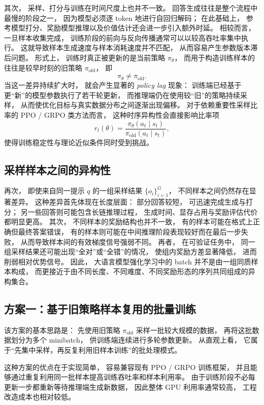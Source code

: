 \documentclass[UTF8]{ctexart}
\begin{document}
其次，
采样、打分与训练在时间尺度上也并不一致。
回答生成往往是整个流程中最慢的阶段之一，
因为模型必须逐 token 地进行自回归解码；
在此基础上，
参考模型打分、奖励模型推理以及价值估计还会进一步引入额外时延。
相较而言，
一旦样本收集完成，
训练阶段的前向与反向传播通常可以以较高吞吐率集中执行。
这就导致样本生成速度与样本消耗速度并不匹配，
从而容易产生参数版本滞后问题。
形式上，
训练时真正被更新的是当前策略 $\pi_\theta$，
而用于构造训练样本的往往是较早时刻的旧策略 $\pi_{\mathrm{old}}$，
即
\begin{equation}
\pi_\theta \neq \pi_{\mathrm{old}}.
\end{equation}
当这一差异持续扩大时，
就会产生显著的 \emph{policy lag} 现象：
训练端已经基于更“新”的模型参数执行了若干轮更新，
而推理端仍在使用较“旧”的策略持续采样，
从而使优化目标与真实数据分布之间逐渐出现偏移。
对于依赖重要性采样比率的 PPO / GRPO 类方法而言，
这种时序异构性会直接影响比率项
\begin{equation}
r_t(\theta)=\frac{\pi_\theta(a_t\mid s_t)}{\pi_{\mathrm{old}}(a_t\mid s_t)},
\end{equation}
使得训练稳定性与理论近似条件同时受到挑战。

\subsection{采样样本之间的异构性}

再次，
即使来自同一提示 $q$ 的一组采样结果 $\{o_i\}_{i=1}^{G}$，
不同样本之间仍然存在显著差异。
这种差异首先体现在长度层面：
部分回答较短，
可迅速完成生成与打分；
另一些回答则可能包含长链推理过程，
生成时间、显存占用与奖励评估代价都明显更高。
其次，
不同样本的奖励结构也并不一致，
有的样本可能在格式上正确但最终答案错误，
有的样本则可能在中间推理阶段表现较好而在最后一步失败，
从而导致样本间的有效梯度信号强弱不同。
再者，
在可验证任务中，
同一组采样结果还可能出现“全对”或“全错”的情况，
使组内奖励方差显著降低，
进而削弱相对优势信号。
因此，
大语言模型强化学习中的 batch 并不是由一组同质样本构成，
而更接近于由不同长度、不同难度、不同奖励形态的序列共同组成的异构集合。
\subsection{方案一：基于旧策略样本复用的批量训练}

该方案的基本思路是：
先使用旧策略 $\pi_{\mathrm{old}}$ 采样一批较大规模的数据，
再将这批数据划分为多个 minibatch，
供训练端连续进行多轮参数更新。
从直观上看，
它属于“先集中采样，再反复利用旧样本训练”的批处理模式。

这种方案的优点在于实现简单，
容易兼容现有 PPO / GRPO 训练框架，
并且能够通过重复利用同一批样本提高训练吞吐率和样本利用率。
由于训练阶段不必每更新一步都重新等待推理端生成新数据，
因此整体 GPU 利用率通常较高，
工程改造成本也相对较低。
\end{document}
